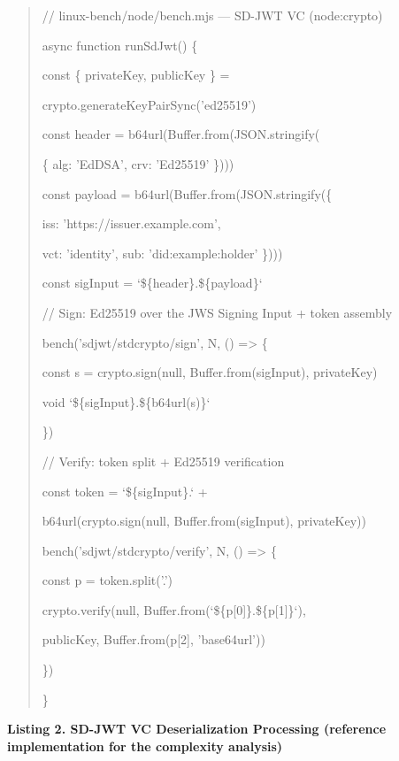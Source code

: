 \begin{quote}
// linux-bench/node/bench.mjs --- SD-JWT VC (node:crypto)

async function runSdJwt() \{

const \{ privateKey, publicKey \} =

crypto.generateKeyPairSync('ed25519')

const header = b64url(Buffer.from(JSON.stringify(

\{ alg: 'EdDSA', crv: 'Ed25519' \})))

const payload = b64url(Buffer.from(JSON.stringify(\{

iss: 'https://issuer.example.com',

vct: 'identity', sub: 'did:example:holder' \})))

const sigInput = `\$\{header\}.\$\{payload\}`

// Sign: Ed25519 over the JWS Signing Input + token assembly

bench('sdjwt/stdcrypto/sign', N, () =\textgreater{} \{

const s = crypto.sign(null, Buffer.from(sigInput), privateKey)

void `\$\{sigInput\}.\$\{b64url(s)\}`

\})

// Verify: token split + Ed25519 verification

const token = `\$\{sigInput\}.` +

b64url(crypto.sign(null, Buffer.from(sigInput), privateKey))

bench('sdjwt/stdcrypto/verify', N, () =\textgreater{} \{

const p = token.split('.')

crypto.verify(null, Buffer.from(`\$\{p{[}0{]}\}.\$\{p{[}1{]}\}`),

publicKey, Buffer.from(p{[}2{]}, 'base64url'))

\})

\}
\end{quote}

\textbf{Listing 2. SD-JWT VC Deserialization Processing (reference implementation for the complexity analysis)}

